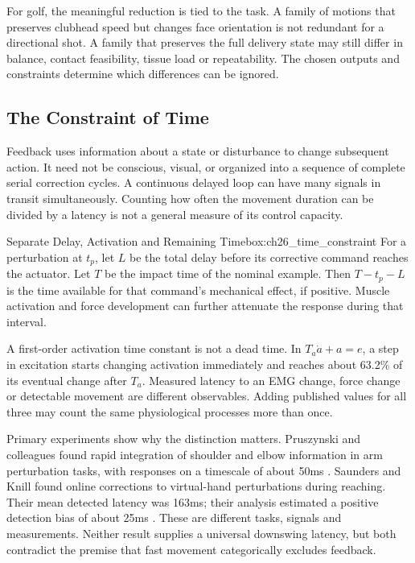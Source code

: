 For golf, the meaningful reduction is tied to the task. A family of motions that preserves clubhead speed but changes face orientation is not redundant for a directional shot. A family that preserves the full delivery state may still differ in balance, contact feasibility, tissue load or repeatability. The chosen outputs and constraints determine which differences can be ignored.

\subsection{The Constraint of Time}
\label{subsec:ch26_time_constraint}

Feedback uses information about a state or disturbance to change subsequent action. It need not be conscious, visual, or organized into a sequence of complete serial correction cycles. A continuous delayed loop can have many signals in transit simultaneously. Counting how often the movement duration can be divided by a latency is not a general measure of its control capacity.

\begin{constraintbox}{Separate Delay, Activation and Remaining Time}{box:ch26_time_constraint}
For a perturbation at $t_p$, let $L$ be the total delay before its corrective command reaches the actuator. Let $T$ be the impact time of the nominal example. Then $T-t_p-L$ is the time available for that command's mechanical effect, if positive. Muscle activation and force development can further attenuate the response during that interval.

A first-order activation time constant is not a dead time. In $T_a\dot a+a=e$, a step in excitation starts changing activation immediately and reaches about 63.2\% of its eventual change after $T_a$. Measured latency to an EMG change, force change or detectable movement are different observables. Adding published values for all three may count the same physiological processes more than once.
\end{constraintbox}

Primary experiments show why the distinction matters. Pruszynski and colleagues found rapid integration of shoulder and elbow information in arm perturbation tasks, with responses on a timescale of about 50ms \citep{Pruszynski2011Feedback}. Saunders and Knill found online corrections to virtual-hand perturbations during reaching. Their mean detected latency was 163ms; their analysis estimated a positive detection bias of about 25ms \citep{Saunders2003Feedback}. These are different tasks, signals and measurements. Neither result supplies a universal downswing latency, but both contradict the premise that fast movement categorically excludes feedback.

